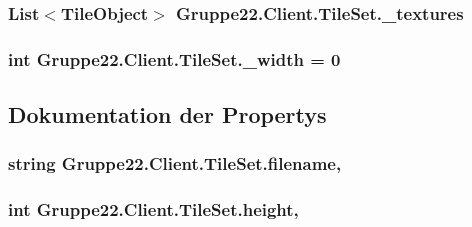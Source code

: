 \hypertarget{class_gruppe22_1_1_client_1_1_tile_set_a332828d2999a514c32a3c24d2d7d48f6}{
\subsubsection[{\-\_\-textures}]{\setlength{\rightskip}{0pt plus 5cm}List$<${\bf Tile\-Object}$>$ Gruppe22.\-Client.\-Tile\-Set.\-\_\-textures\hspace{0.3cm}{\ttfamily [protected]}}}\label{class_gruppe22_1_1_client_1_1_tile_set_a332828d2999a514c32a3c24d2d7d48f6}
\hypertarget{class_gruppe22_1_1_client_1_1_tile_set_a4e36d9c553edb1cee5cf05bea5740d84}{
\subsubsection[{\-\_\-width}]{\setlength{\rightskip}{0pt plus 5cm}int Gruppe22.\-Client.\-Tile\-Set.\-\_\-width = 0\hspace{0.3cm}{\ttfamily [protected]}}}\label{class_gruppe22_1_1_client_1_1_tile_set_a4e36d9c553edb1cee5cf05bea5740d84}


\subsection{Dokumentation der Propertys}
\hypertarget{class_gruppe22_1_1_client_1_1_tile_set_afce49a3941b2d4a360990f9847282da1}{
\subsubsection[{filename}]{\setlength{\rightskip}{0pt plus 5cm}string Gruppe22.\-Client.\-Tile\-Set.\-filename\hspace{0.3cm}{\ttfamily [get]}, {\ttfamily [set]}}}\label{class_gruppe22_1_1_client_1_1_tile_set_afce49a3941b2d4a360990f9847282da1}
\hypertarget{class_gruppe22_1_1_client_1_1_tile_set_a12343c861014c3631e1a40dfeef20312}{
\subsubsection[{height}]{\setlength{\rightskip}{0pt plus 5cm}int Gruppe22.\-Client.\-Tile\-Set.\-height\hspace{0.3cm}{\ttfamily [get]}, {\ttfamily [set]}}}\label{class_gruppe22_1_1_client_1_1_tile_set_a12343c861014c3631e1a40dfeef20312}


